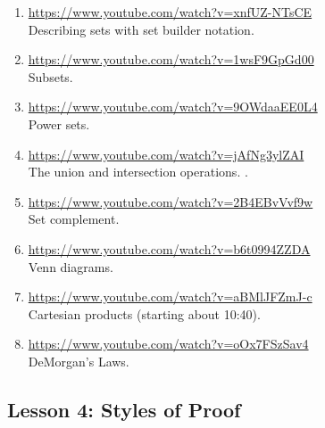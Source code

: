 \documentclass[11pt]{amsart}
\begin{document}
\begin{enumerate}

\item \url{https://www.youtube.com/watch?v=xnfUZ-NTsCE}\\
Describing sets with set builder notation.\\[5pt]

\item \url{https://www.youtube.com/watch?v=1wsF9GpGd00}\\
Subsets.\\[5pt]

\item \url{https://www.youtube.com/watch?v=9OWdaaEE0L4}\\
Power sets.\\[5pt]

\item \url{https://www.youtube.com/watch?v=jAfNg3ylZAI}\\
The union and intersection operations.
.\\[5pt]


\item \url{https://www.youtube.com/watch?v=2B4EBvVvf9w}\\
Set complement.\\[5pt]


\item \url{https://www.youtube.com/watch?v=b6t0994ZZDA}\\
Venn diagrams.\\[5pt]


\item \url{https://www.youtube.com/watch?v=aBMlJFZmJ-c}\\
Cartesian products (starting about 10:40).\\[5pt]


\item \url{https://www.youtube.com/watch?v=oOx7FSzSav4}\\
DeMorgan's Laws.\\[5pt]


\end{enumerate}

\subsection{Lesson 4: Styles of Proof}
\end{document}
